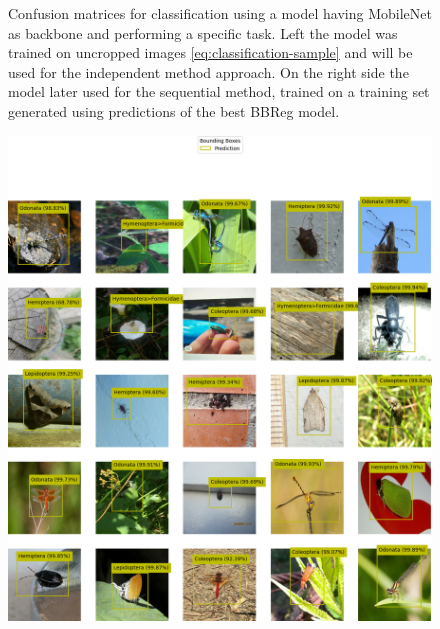 \begin{figure}
\begin{multicols}{2}
\begin{minipage}{.45\textwidth}
        \end{minipage}
    \end{multicols}
    \caption{Confusion matrices for classification using a model having MobileNet as backbone and performing a specific task. Left the model was trained on uncropped images \eqref{eq:classification-sample} and will be used for the independent method approach. On the right side the model later used for the sequential method, trained on a training set generated using predictions of the best BBReg model.}
    \label{fig:extra-classification-mobilenet}
\end{figure}
\begin{figure}
    \centering
    \begin{multicols}{2}
        \begin{minipage}{.45\textwidth}
            \includegraphics[width=\textwidth]{images/independent-model-predictions.png}
        \end{minipage}
        \columnbreak
        \begin{minipage}{.45\textwidth}
            \vspace{20pt}

\end{minipage}
\end{multicols}
\end{figure}
